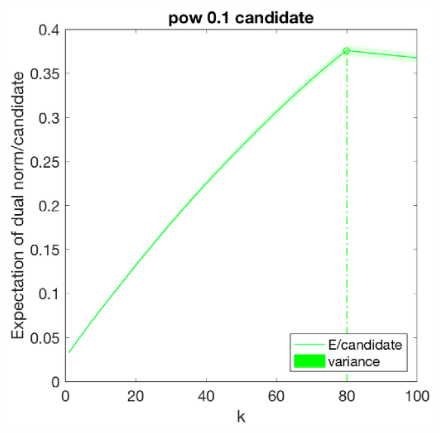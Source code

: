 \documentclass[12pt]{article}
\begin{document}
\begin{figure}[h]
\begin{minipage}[c]{.3\linewidth}
    \end{minipage}
    \hfill%
    \begin{minipage}[c]{.3\linewidth}
        \centering
        \includegraphics[width=\linewidth]{Fig/dualnorm-u0ones-k0-80-candidatepow.eps}
    \end{minipage}
\end{figure}
\end{document}
